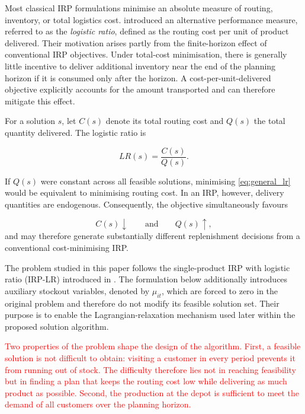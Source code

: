 \documentclass{article}
\begin{document}
Most classical IRP formulations minimise an absolute measure of routing,
inventory, or total logistics cost. \cite{archetti2017logistic} introduced an
alternative performance measure, referred to as the \emph{logistic ratio},
defined as the routing cost per unit of product delivered. Their motivation
arises partly from the finite-horizon effect of conventional IRP objectives.
Under total-cost minimisation, there is generally little incentive to deliver
additional inventory near the end of the planning horizon if it is consumed
only after the horizon. A cost-per-unit-delivered objective explicitly
accounts for the amount transported and can therefore mitigate this effect.

For a solution $s$, let $C(s)$ denote its total routing cost and $Q(s)$ the
total quantity delivered. The logistic ratio is

\begin{equation}
    LR(s)=\frac{C(s)}{Q(s)}.
    \label{eq:general_lr}
\end{equation}

If $Q(s)$ were constant across all feasible solutions, minimising
\eqref{eq:general_lr} would be equivalent to minimising routing cost.
In an IRP, however, delivery quantities are endogenous. Consequently, the
objective simultaneously favours

\begin{equation*}
    C(s)\downarrow
    \qquad \text{and} \qquad
    Q(s)\uparrow,
\end{equation*}
and may therefore generate substantially different replenishment decisions
from a conventional cost-minimising IRP.

The problem studied in this paper follows the single-product IRP with logistic
ratio (IRP-LR) introduced in \cite{archetti2017logistic}. The formulation
below additionally introduces auxiliary stockout variables, denoted by
$\mu_{it}$, which are forced to zero in the original problem and therefore do
not modify its feasible solution set. Their purpose is to enable the
Lagrangian-relaxation mechanism used later within the proposed solution
algorithm.

\textcolor{red}{Two properties of the problem shape the design of the
algorithm. First, a feasible solution is not difficult to obtain: visiting a
customer in every period prevents it from running out of stock. The
difficulty therefore lies not in reaching feasibility but in finding a plan
that keeps the routing cost low while delivering as much product as
possible. Second, the production at the depot is sufficient to meet the
demand of all customers over the planning horizon.}
\end{document}
